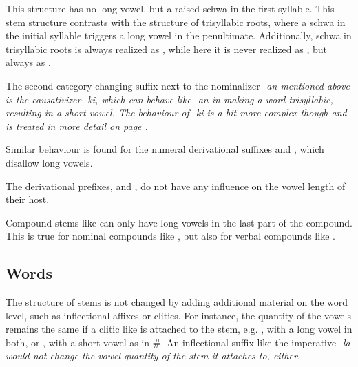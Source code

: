 This structure has no long vowel, but a raised schwa in the first syllable. This stem structure contrasts with the structure of trisyllabic roots, where a schwa in the initial syllable  triggers a long vowel in the penultimate. Additionally, schwa in trisyllabic roots is always realized as , while here it is never realized as \phonet{\E}, but always as .




The second category-changing suffix next to the nominalizer \em -an \em mentioned above is the causativizer \em -ki\ng\em, which can behave like \em -an \em in making a word trisyllabic, resulting in a short vowel. The behaviour of \em -ki\ng{} \em is a bit more complex though and is treated in more detail on page \pageref{page:phon:king}.

Similar behaviour is found for the numeral derivational suffixes  and , which disallow long vowels.

The   derivational prefixes,  and , do not have any influence on the vowel length of their host.

Compound stems like  can only have long vowels in the last part of the compound. This is true for nominal compounds like , but also for verbal compounds like .




\subsection{Words}\label{sec:phon:struct:Words}
The structure of stems is not changed by adding additional material on the word level, such as inflectional affixes or clitics. For instance, the quantity of the vowels remains the same if a clitic like  is attached to the stem, e.g. ,  with a long vowel in both, or , with a short vowel as in \#. An inflectional suffix like the imperative \em -la \em would   not change the vowel quantity of the stem it attaches to, either.

